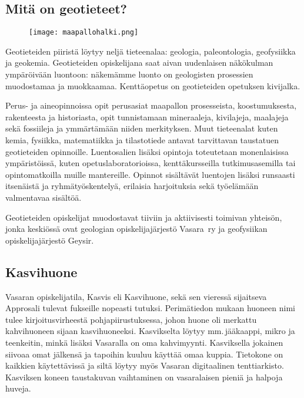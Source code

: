 \documentclass[../ala_hataile.tex]{subfiles}
\begin{document}
\clearpage

\raggedbottom
{}
\subsection*{Mitä on geotieteet?}
\begin{figure}[b!]
	\texttt{[image: maapallohalki.png]}
\end{figure}
Geotieteiden piiristä löytyy neljä tieteen\-alaa: geologia, paleontologia, geofysiikka ja geokemia. Geotieteiden opiskelijana saat aivan uudenlaisen näkökulman ympäröivään luontoon: näkemämme luonto on geologisten prosessien muodostamaa ja muokkaamaa. Kenttäopetus on geotieteiden opetuksen kivijalka.

Perus- ja aineopinnoissa opit perusasiat maapallon prosesseista, koostumuksesta, rakenteesta ja historiasta, opit tunnistamaan mineraaleja, kivilajeja, maalajeja sekä fossiileja ja ymmärtämään niiden merkityksen. Muut tieteenalat kuten kemia, fysiikka, matematiikka ja tilastotiede antavat tarvittavan taustatuen geotieteiden opinnoille. Luentosalien lisäksi opintoja toteutetaan monenlaisissa ympäristöissä, kuten opetuslaboratorioissa, kenttäkursseilla tutkimusasemilla tai opintomatkoilla muille mantereille. Opinnot sisältävät luentojen lisäksi runsaasti itsenäistä ja ryhmätyöskentelyä, erilaisia harjoituksia sekä työelämään valmentavaa sisältöä.

Geotieteiden opiskelijat muodostavat tiiviin ja aktiivisesti toimivan yhteisön, jonka keskiössä ovat geologian opiskelijajärjestö Vasara~ry ja geofysiikan opiskelijajärjestö Geysir.

\subsection*{Kasvihuone}
Vasaran opiskelijatila, Kasvis eli Kasvihuone, sekä sen vieressä sijaitseva Appro\-sali tulevat fukseille nopeasti tutuksi. Perimätiedon mukaan huoneen nimi tulee kirjoitus\-virheestä pohja\-piirustuksessa, johon huone oli merkattu kahvi\-huoneen sijaan kasvi\-huoneeksi. Kasvikselta löytyy mm.\,jääkaappi, mikro ja teenkeitin, minkä lisäksi Vasaralla on oma kahvi\-myynti. Kasviksella jokainen siivoaa omat jälkensä ja tapoihin kuuluu käyttää omaa kuppia. Tietokone on kaikkien käytettävissä ja siltä löytyy myös Vasaran digitaalinen tenttiarkisto. Kasviksen koneen tausta\-kuvan vaihtaminen on vasaralaisen pieniä ja halpoja huveja.
\end{document}
